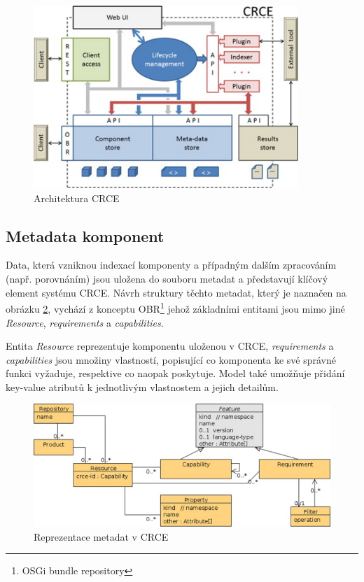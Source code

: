 \documentclass[czech,DP]{thesiskiv}
\begin{document}
\begin{figure}[h]
	\centering
	\includegraphics[width=10cm]{crce-arch.jpg}
	\caption{Architektura CRCE}
	\label{fig:crce-arch}
\end{figure} 

\subsection{Metadata komponent}
\label{subsec:crce-metadata}

Data, která vzniknou indexací komponenty a případným dalším zpracováním (např. porovnáním) jsou uložena do souboru metadat a představují klíčový element systému CRCE. Návrh struktury  těchto metadat, který je naznačen na obrázku \ref{fig:crce-resource-uml}, vychází z konceptu OBR\footnote{OSGi bundle repository} jehož základními entitami jsou mimo jiné \textit{Resource}, \textit{requirements} a \textit{capabilities}\cite{brada2015repository}. 

Entita \textit{Resource} reprezentuje komponentu uloženou v CRCE, \textit{requirements} a \textit{capabilities} jsou množiny vlastností, popisující co komponenta ke své správné funkci vyžaduje, respektive co naopak poskytuje. Model také umožňuje přidání key-value atributů k jednotlivým vlastnostem a jejich detailům.
 
 \begin{figure}[h]
 	\centering
 	\includegraphics{resource-uml}
 	\caption{Reprezentace metadat v CRCE}
 	\label{fig:crce-resource-uml}
 \end{figure}
\end{document}
